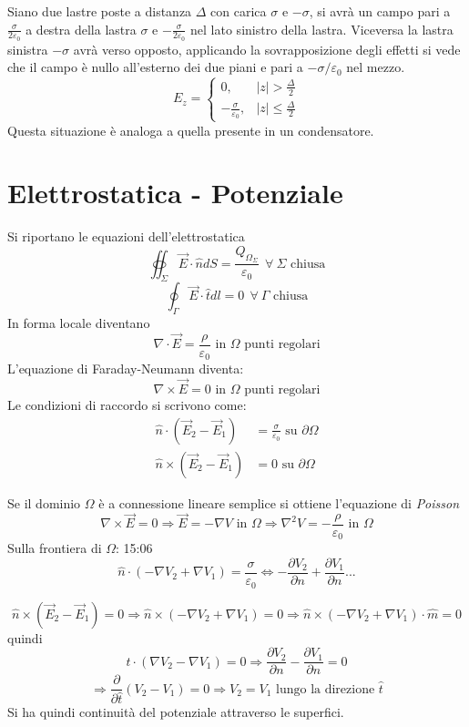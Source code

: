 Siano due lastre poste a distanza $\Delta$ con carica $\sigma$ e $-\sigma$,
si avrà un campo pari a $\frac{\sigma}{2\varepsilon_0}$ a destra della
lastra $\sigma$ e $-\frac{\sigma}{2\varepsilon_0}$ nel lato sinistro della lastra.
Viceversa la lastra sinistra $-\sigma$ avrà verso opposto, applicando la sovrapposizione degli 
effetti si vede che il campo è nullo all'esterno dei due piani e pari a $-\sigma/\varepsilon_0$ 
nel mezzo.
$$
E_z = \begin{cases}
0, & |z| > \frac{\Delta}{2}\\
-\frac{\sigma}{\varepsilon_0}, & |z| \leq \frac{\Delta}{2}
\end{cases}
$$
Questa situazione è analoga a quella presente in un condensatore.

\section{Elettrostatica - Potenziale}
Si riportano le equazioni dell'elettrostatica
$$
\oiint_\Sigma \vec{E}\cdot\hat{n} dS = \frac{Q_{\Omega_\Sigma}}{\varepsilon_0}\ \ \forall\ \Sigma \text{ chiusa}
$$
$$
\oint_\Gamma \vec{E}\cdot\hat{t} dl =0\ \ \forall\ \Gamma \text{ chiusa}
$$
In forma locale diventano
$$
\nabla\cdot\vec{E} = \frac{\rho}{\varepsilon_0} \text{ in } \Omega \text{ punti regolari}
$$
L'equazione di Faraday-Neumann diventa:
$$
\nabla \times \vec{E} = 0 \text{ in } \Omega \text{ punti regolari}
$$
Le condizioni di raccordo si scrivono come:
$$
\begin{aligned}
\hat{n}\cdot (\vec{E}_2 - \vec{E}_1) &= \frac{\sigma}{\varepsilon_0} \text{ su } \partial\Omega\\
\hat{n}\times (\vec{E}_2 - \vec{E}_1) &= 0 \text{ su } \partial\Omega
\end{aligned}
$$

Se il dominio $\Omega$ è a connessione lineare semplice si ottiene l'equazione di \textit{Poisson}
$$
\nabla\times\vec{E} = 0 \Rightarrow \vec{E} = - \nabla V \text{ in } \Omega \Rightarrow \nabla^2V = -\frac{\rho}{\varepsilon_0} \text{ in } \Omega
$$
Sulla frontiera di $\Omega$: 15:06
$$
\hat{n}\cdot\left(-\nabla V_2 + \nabla V_1\right) = \frac{\sigma}{\varepsilon_0} \Leftrightarrow
-\frac{\partial V_2}{\partial n} + \frac{\partial V_1}{\partial n}...
$$


$$
\hat{n}\times\left(\vec{E}_2-\vec{E}_1\right) = 0 \Rightarrow \hat{n}\times\left(-\nabla V_2 + \nabla V_1\right) = 0 \Rightarrow \hat{n}\times\left(-\nabla V_2 + \nabla V_1\right)\cdot\hat{m} = 0
$$
quindi
$$
\hat{t}\cdot\left(\nabla V_2 - \nabla V_1\right) = 0 \Rightarrow \frac{\partial V_2}{\partial n} - \frac{\partial V_1}{\partial n} = 0
$$
$$
\Rightarrow \frac{\partial}{\partial \hat{t}}(V_2-V_1) = 0 \Rightarrow V_2 = V_1
\text{ lungo la direzione }\hat{t}
$$
Si ha quindi continuità del potenziale attraverso le superfici.

